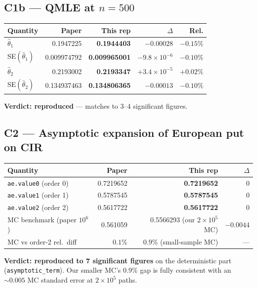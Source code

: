 \documentclass[11pt]{article}
\begin{document}
\subsection*{C1b --- QMLE at $n = 500$}
\begin{center}
\begin{tabular}{lrrrr}
\toprule
Quantity & Paper & This rep & $\Delta$ & Rel. \\
\midrule
$\hat\theta_1$      & 0.1947225   & \textbf{0.1944403}   & $-0.00028$    & $-0.15\%$ \\
SE$(\hat\theta_1)$  & 0.009974792 & \textbf{0.009965001} & $-9.8\!\times\!10^{-6}$ & $-0.10\%$ \\
$\hat\theta_2$      & 0.2193002   & \textbf{0.2193347}   & $+3.4\!\times\!10^{-5}$ & $+0.02\%$ \\
SE$(\hat\theta_2)$  & 0.134937463 & \textbf{0.134806365} & $-0.00013$    & $-0.10\%$ \\
\bottomrule
\end{tabular}
\end{center}
\textbf{Verdict: reproduced} --- matches to 3--4 significant figures.

\subsection*{C2 --- Asymptotic expansion of European put on CIR}
\begin{center}
\begin{tabular}{lrrr}
\toprule
Quantity & Paper & This rep & $\Delta$ \\
\midrule
\texttt{ae.value0} (order 0) & 0.7219652 & \textbf{0.7219652} & 0 \\
\texttt{ae.value1} (order 1) & 0.5787545 & \textbf{0.5787545} & 0 \\
\texttt{ae.value2} (order 2) & 0.5617722 & \textbf{0.5617722} & 0 \\
MC benchmark (paper $10^6$) & 0.561059 & 0.5566293 (our $2\!\times\!10^5$ MC) & $-0.0044$ \\
MC vs order-2 rel.\ diff & $0.1\%$ & $0.9\%$ (small-sample MC) & --- \\
\bottomrule
\end{tabular}
\end{center}
\textbf{Verdict: reproduced to 7 significant figures} on the deterministic
part (\texttt{asymptotic\_term}). Our smaller MC's 0.9\% gap is fully
consistent with an $\sim\!0.005$ MC standard error at $2\!\times\!10^5$ paths.
\end{document}
